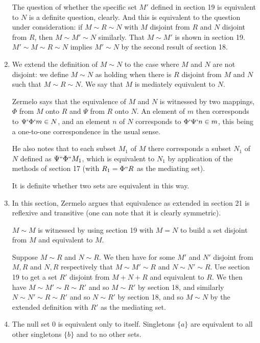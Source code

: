 \documentclass[12pt]{article}
\begin{document}
\begin{enumerate}
The question of whether the specific set $M'$ defined in section 19 is equivalent to $N$ is a definite question, clearly.  And this is equivalent to the question under consideration:
if $M \sim R \sim N$ with $M$ disjoint from $R$ and $N$ disjoint from $R$, then $M \sim M' \sim N$ similarly.  That $M \sim M'$ is shown in section 19.  $M' \sim M \sim R \sim N$ implies
$M' \sim N$ by the second result of section 18.

\item  We extend the definition of $M \sim N$ to the case where $M$ and $N$ are not disjoint:  we define $M \sim N$ as holding when there is $R$ disjoint from $M$ and $N$ such that
$M \sim R \sim N$.  We say that $M$ is mediately equivalent to $N$.  

Zermelo says that the equivalence of $M$ and $N$ is witnessed by two mappings, $\Phi$ from $M$ onto $R$ and $\Psi$ from $R$ onto $N$.  An element of $m$ then corresponds to $\Psi`\Phi`m \in N$, and an element $n$ of $N$ corresponds to $\Phi`\Psi`n \in m$, this being a one-to-one correspondence in the usual sense.

He also notes that to each subset $M_1$ of $M$ there corresponds a subset $N_1$ of $N$ defined as $\Psi``\Phi``M_1$, which is equivalent to $N_1$ by application of the methods of section 17 (with $R_1 = \Phi``R$ as the mediating set).

It is definite whether two sets are equivalent in this way.

\item  In this section, Zermelo argues that equivalence as extended in section 21 is reflexive and transitive (one can note that it is clearly symmetric).

$M \sim M$ is witnessed by using section 19 with $M=N$ to build a set disjoint from $M$ and equivalent to $M$.

Suppose $M\sim R$ and $N \sim R$.  We then have for some $M'$ and $N'$ disjoint from $M, R$ and $N,R$ respectively that $M \sim M' \sim R$ and $N \sim N' \sim R$.
Use section 19 to get a set $R'$ disjoint from $M+N+R$ and equivalent to $R$.  We then have $M \sim M' \sim  R \sim R'$ and so $M \sim R'$ by section 18, and
similarly $N \sim N' \sim  R \sim R'$ and so $N \sim R'$ by section 18, and so $M \sim N$ by the extended definition with $R'$ as the mediating set.

\item  The null set 0 is equivalent only to itself.  Singletons $\{a\}$ are equivalent to all other singletons $\{b\}$ and to no other sets.


\end{enumerate}
\end{document}
